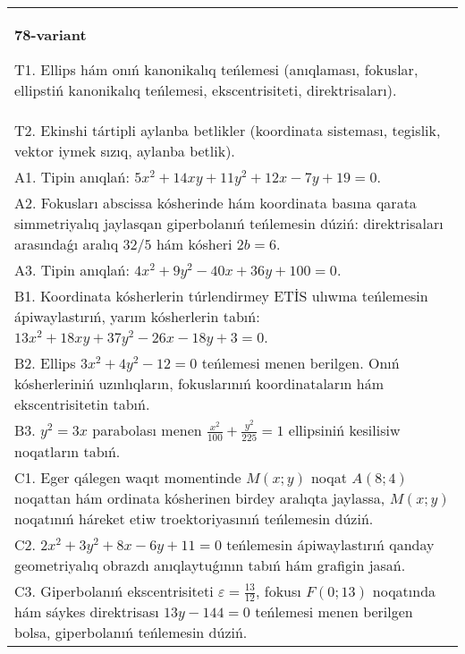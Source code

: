 \documentclass{article}
\begin{document}
\begin{tabular}{m{17cm}}
\textbf{78-variant}
\newline

T1. Ellips hám onıń kanonikalıq teńlemesi (anıqlaması, fokuslar, ellipstiń kanonikalıq teńlemesi, ekscentrisiteti, direktrisaları).\\

T2. Ekinshi tártipli aylanba betlikler (koordinata sisteması, tegislik, vektor iymek sızıq, aylanba betlik).\\

A1. Tipin anıqlań: $5 x^{2}+14 xy+11 y^{2}+12 x-7 y+19=0$.\\

A2. Fokusları abscissa kósherinde hám koordinata basına qarata simmetriyalıq jaylasqan giperbolanıń teńlemesin dúziń: direktrisaları arasındaǵı aralıq $32/5$ hám kósheri $2 b=6$.\\

A3. Tipin anıqlań: $4 x^2+9 y^2-40 x+36 y+100=0$.\\

B1. Koordinata kósherlerin túrlendirmey ETİS ulıwma teńlemesin ápiwaylastırıń, yarım kósherlerin tabıń: $13x^{2} + 18xy + 37y^{2} - 26x - 18y + 3 = 0$.  \\

B2. Ellips $3x^{2} + 4y^{2} - 12 = 0$ teńlemesi menen berilgen. Onıń kósherleriniń uzınlıqların, fokuslarınıń koordinataların hám ekscentrisitetin tabıń.  \\

B3. $y^{2} = 3x$ parabolası menen $\frac{x^{2}}{100} + \frac{y^{2}}{225} = 1$ ellipsiniń kesilisiw noqatların tabıń.  \\

C1. Eger qálegen waqıt momentinde $M(x;y)$ noqat $A(8;4)$ noqattan hám ordinata kósherinen birdey aralıqta jaylassa, $M(x;y)$ noqatınıń háreket etiw troektoriyasınıń teńlemesin dúziń.  \\

C2. $2x^{2} + 3y^{2} + 8x - 6y + 11 = 0$ teńlemesin ápiwaylastırıń qanday geometriyalıq obrazdı anıqlaytuǵının tabıń hám grafigin jasań.\\

C3. Giperbolanıń ekscentrisiteti $\varepsilon = \frac{13}{12}$, fokusı $F(0;13)$ noqatında hám sáykes direktrisası $13y - 144 = 0$ teńlemesi menen berilgen bolsa, giperbolanıń teńlemesin dúziń.  \\

\end{tabular}
\vspace{1cm}
\end{document}
